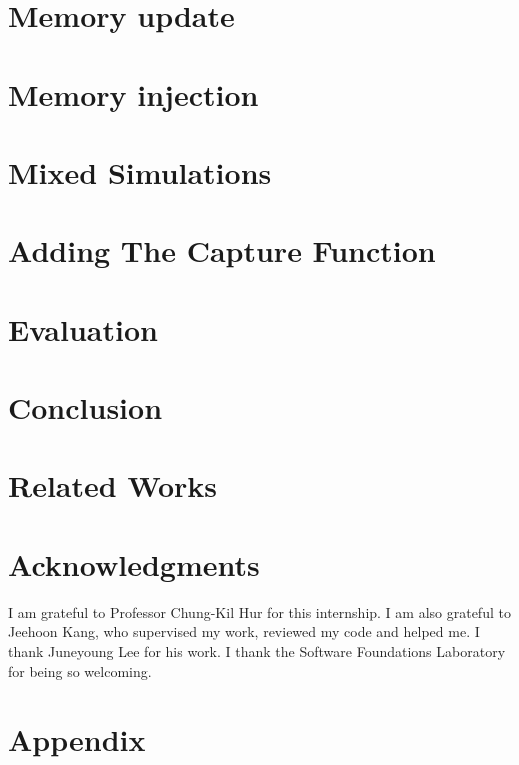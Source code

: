\documentclass{llncs2e/llncs}
\begin{document}
\section{Memory update}

\section{Memory injection}

\section{Mixed Simulations}

\section{Adding The Capture Function}


\section{Evaluation}


\section{Conclusion}


\section{Related Works}


\section*{Acknowledgments}
I am grateful to Professor Chung-Kil Hur for this internship. I am also grateful to Jeehoon Kang, who supervised my work, reviewed my code and helped me. I thank Juneyoung Lee for his work. I thank the Software Foundations Laboratory for being so welcoming.


%
%
\newpage
{}
\nocite{*}



\newpage
\section{Appendix}

\end{document}
